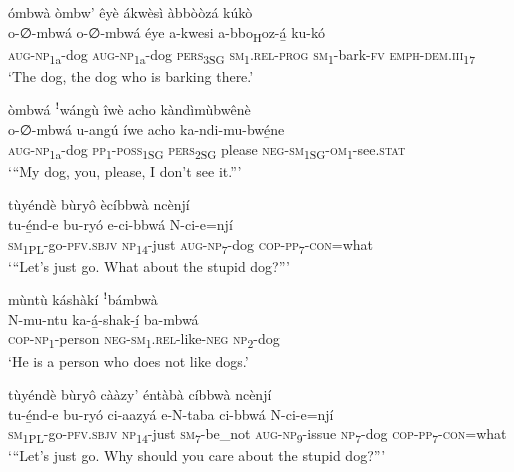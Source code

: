 ómbwà òmbw’ êyè ákwèsì àbbòòzá kúkò\\
\gll o-∅-mbwá    o-∅-mbwá éye    a-kwesi    a-bbo\textsubscript{H}oz-á̲  ku-kó \\
\textsc{aug}{}-\textsc{np}\textsubscript{1a}{}-dog  \textsc{aug}{}-\textsc{np}\textsubscript{1a}{}-dog
\textsc{pers}\textsubscript{3SG}  \textsc{sm}\textsubscript{1}.\textsc{rel}{}-\textsc{prog}  \textsc{sm}\textsubscript{1}{}-bark-\textsc{fv}  \textsc{emph}{}-\textsc{dem}.\textsc{iii}\textsubscript{17}\\
\glt ‘The dog, the dog who is barking there.’\bigskip

òmbwá ꜝwángù îwè acho kàndìmùbwênè\\
\gll o-∅-mbwá    u-angú  íwe    acho  ka-ndi-mu-bwé̲ne\\
\textsc{aug}{}-\textsc{np}\textsubscript{1a}{}-dog  \textsc{pp}\textsubscript{1}{}-\textsc{poss}\textsubscript{1SG}  \textsc{pers}\textsubscript{2SG}  please  \textsc{neg}{}-\textsc{sm}\textsubscript{1SG}{}-\textsc{om}\textsubscript{1}{}-see.\textsc{stat}\\
\glt ‘“My dog, you, please, I don’t see it.”’\bigskip

tùyéndè bùryô ècíbbwà ncènjí\\
\gll tu-é̲nd-e    bu-ryó  e-ci-bbwá    N-ci-e=njí\\
\textsc{sm}\textsubscript{1PL}{}-go-\textsc{pfv}.\textsc{sbjv}  \textsc{np}\textsubscript{14}{}-just  \textsc{aug}{}-\textsc{np}\textsubscript{7}{}-dog    \textsc{cop}{}-\textsc{pp}\textsubscript{7}{}-\textsc{con}=what\\
\glt ‘“Let’s just go. What about the stupid dog?”’\bigskip

mùntù káshàkí ꜝbámbwà\\
\gll N-mu-ntu    ka-á̲-shak-í̲      ba-mbwá\\
\textsc{cop}{}-\textsc{np}\textsubscript{1}{}-person  \textsc{neg}{}-\textsc{sm}\textsubscript{1}.\textsc{rel}{}-like-\textsc{neg}  \textsc{np}\textsubscript{2}{}-dog\\
\glt ‘He is a person who does not like dogs.’\bigskip

tùyéndè bùryô cààzy’ éntàbà cíbbwà ncènjí\\
\gll tu-é̲nd-e    bu-ryó ci-aazyá  e-N-taba    ci-bbwá  N-ci-e=njí \\
\textsc{sm}\textsubscript{1PL}{}-go-\textsc{pfv}.\textsc{sbjv}  \textsc{np}\textsubscript{14}{}-just
\textsc{sm}\textsubscript{7}{}-be\_not  \textsc{aug}{}-\textsc{np}\textsubscript{9}{}-issue  \textsc{np}\textsubscript{7}{}-dog  \textsc{cop}{}-\textsc{pp}\textsubscript{7}{}-\textsc{con}=what\\
\glt ‘“Let’s just go. Why should you care about the stupid dog?”’\bigskip

